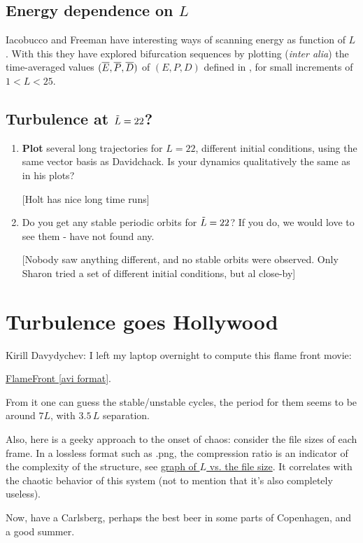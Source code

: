 \documentclass[letterpaper,10pt,fleqn,notitlepage]{article}
\begin{document}
\subsection{Energy dependence on $L$}

Iacobucco and Freeman have interesting ways of scanning 
energy as function of $L$.
With this they have explored bifurcation sequences 
by plotting ({\em inter alia}) the time-averaged values 
$(\overline{E},\overline{P},\overline{D})$ of $(E,P,D)$ 
defined in , for small increments of
$ 1< L < 25$.

\subsection{Turbulence at $\tilde{L}=22$?}

\begin{enumerate}
\item
{\bf Plot} several long trajectories for  $L = 22$,
different initial conditions, 
using the same vector basis as Davidchack. Is your dynamics
qualitatively the same as in his plots?

[Holt has nice long time runs]

\item
Do you get any stable periodic orbits for $\tilde{L}=22$? 
If you do, we would love to see them - have not found any.

[Nobody saw anything different, and no stable orbits
were observed. Only Sharon tried a set of different initial conditions,
but al close-by]
\end{enumerate}


\section{Turbulence goes Hollywood}

Kirill Davydychev:  %
I left my laptop overnight to compute this
flame front  movie:

\href{FlameFrontKD.avi}{FlameFront [avi format]}.

From it 
one can guess the stable/unstable cycles, the
period for them seems to be around $7L$, with $3.5 \, L$ separation.

Also, here is a geeky approach to the onset of chaos:
consider the file
sizes of each frame. In a lossless format such as .png, the
compression ratio is an indicator of the complexity of the
structure, see \href{KDfileCompress.png}{graph of $L$ vs. the file size}. 
It correlates with the chaotic behavior of this system
(not to mention that it's also completely useless).


Now, have a Carlsberg, perhaps the best beer 
in some parts of Copenhagen, and a good summer.



\end{document}
